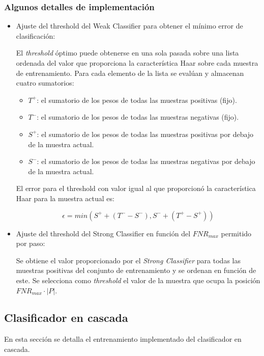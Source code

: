 \documentclass[11pt,spanish,a4paper]{article} %
\begin{document}
\subsubsection{Algunos detalles de implementación}

\begin{itemize}
\item Ajuste del threshold del Weak Classifier para obtener el mínimo error de clasificación:

\vspace*{1em}El \textit{threshold} óptimo puede obtenerse en una sola pasada sobre una lista ordenada del valor que proporciona la característica Haar sobre cada muestra de entrenamiento. Para cada elemento de la lista se evalúan y almacenan cuatro sumatorios:

\begin{itemize}
\item $T^+$: el sumatorio de los pesos de todas las muestras positivas (fijo).
\item $T^-$: el sumatorio de los pesos de todas las muestras negativas (fijo).
\item $S^+$: el sumatorio de los pesos de todas las muestras positivas por debajo de la muestra actual.
\item $S^-$: el sumatorio de los pesos de todas las muestras negativas por debajo de la muestra actual.
\end{itemize}

El error para el threshold con valor igual al que proporcionó la característica Haar para la muestra actual es:

\[ \epsilon = min(S^{+} + (T^{-} - S^{-}), S^{-} + (T^{+} - S^{+})) \]

\item Ajuste del threshold del Strong Classifier en función del $FNR_{max}$ permitido por paso:

Se obtiene el valor proporcionado por el \textit{Strong Classifier} para todas las muestras positivas del conjunto de entrenamiento y se ordenan en función de este. Se selecciona como \textit{threshold} el valor de la muestra que ocupa la posición $FNR_{max} \cdot |P|$.

\end{itemize}

\subsection{Clasificador en cascada}

En esta sección se detalla el entrenamiento implementado del clasificador en cascada.
\end{document}
